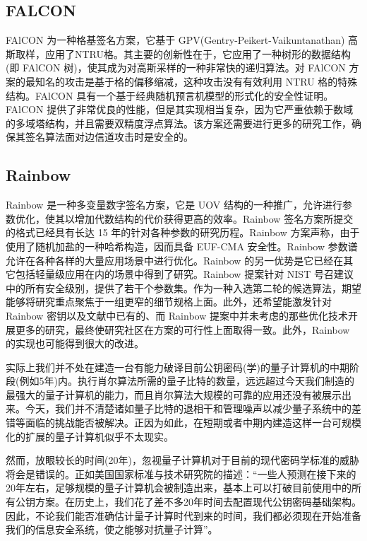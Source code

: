 \subsection{FALCON}

FAlCON 为一种格基签名方案，它基于 GPV(Gentry-Peikert-Vaikuntanathan) 高斯取样，应用了NTRU格。其主要的创新性在于，它应用了一种树形的数据结构(即 FAlCON 树)，使其成为对高斯采样的一种非常快的递归算法。对 FAlCON 方案的最知名的攻击是基于格的偏移缩减，这种攻击没有有效利用 NTRU 格的特殊结构。FAlCON 具有一个基于经典随机预言机模型的形式化的安全性证明。FAlCON 提供了非常优良的性能，但是其实现相当复杂，因为它严重依赖于数域的多域塔结构，并且需要双精度浮点算法。该方案还需要进行更多的研究工作，确保其签名算法面对边信道攻击时是安全的。

\subsection{Rainbow}

Rainbow 是一种多变量数字签名方案，它是 UOV 结构的一种推广，允许进行参数优化，使其以增加代数结构的代价获得更高的效率。Rainbow 签名方案所提交的格式已经具有长达 15 年的针对各种参数的研究历程。Rainbow 方案声称，由于使用了随机加盐的一种哈希构造，因而具备 EUF-CMA 安全性。Rainbow 参数谱允许在各种各样的大量应用场景中进行优化。Rainbow 的另一优势是它已经在其它包括轻量级应用在内的场景中得到了研究。Rainbow 提案针对 NIST 号召建议中的所有安全级别，提供了若干个参数集。作为一种入选第二轮的候选算法，期望能够将研究重点聚焦于一组更窄的细节规格上面。此外，还希望能激发针对 Rainbow 密钥以及文献中已有的、而 Rainbow 提案中并未考虑的那些优化技术开展更多的研究，最终使研究社区在方案的可行性上面取得一致。此外，Rainbow 的实现也可能得到很大的改进。

实际上我们并不处在建造一台有能力破译目前公钥密码(学)的量子计算机的中期阶段(例如5年)内。执行肖尔算法所需的量子比特的数量，远远超过今天我们制造的最强大的量子计算机的能力，而且肖尔算法大规模的可靠的应用还没有被展示出来。今天，我们并不清楚诸如量子比特的退相干和管理噪声以减少量子系统中的差错等面临的挑战能否被解决。正因为如此，在短期或者中期内建造这样一台可规模化的扩展的量子计算机似乎不太现实。

然而，放眼较长的时间(20年)，忽视量子计算机对于目前的现代密码学标准的威胁将会是错误的。正如美国国家标准与技术研究院的描述：“一些人预测在接下来的20年左右，足够规模的量子计算机会被制造出来，基本上可以打破目前使用中的所有公钥方案。在历史上，我们花了差不多20年时间去配置现代公钥密码基础架构。因此，不论我们能否准确估计量子计算时代到来的时间，我们都必须现在开始准备我们的信息安全系统，使之能够对抗量子计算”。

